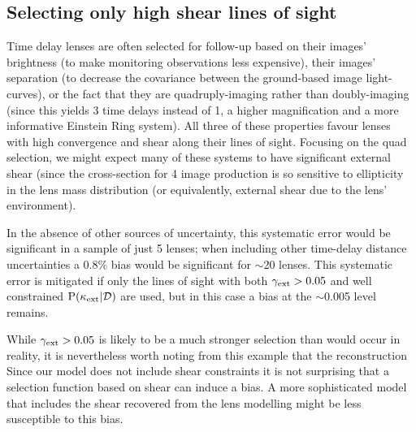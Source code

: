 \documentclass[useAMS,usenatbib,a4paper]{mn2e}
\begin{document}

\subsection{Selecting only high shear lines of sight}
\label{sec:bias:tightPDF}

Time delay lenses are often selected for follow-up based on their images'
brightness (to make monitoring observations less expensive), their images'
separation (to decrease the covariance between the ground-based image
light-curves), or the fact that they are quadruply-imaging rather than
doubly-imaging (since this yields 3 time delays instead of 1, a higher
magnification and a more informative Einstein Ring system). All three of these
properties favour lenses with high convergence and shear along their lines of
sight. Focusing on the quad selection, we might expect many of these systems
to have significant external shear (since the cross-section for 4 image
production is so sensitive to ellipticity in the lens mass distribution (or
equivalently, external shear due to the lens' environment). 

  In the absence of other sources of
uncertainty, this systematic error would be significant in a sample of just 5
lenses; when including other time-delay distance uncertainties a 0.8\% bias would be
significant for $\sim$20 lenses. This systematic error is mitigated if only the lines of sight with both
$\gamma_{\rm ext}>0.05$ and well constrained ${\rm P}(\kappa_{\rm ext}|{\mathcal{D}})$ are used, but in this
case a bias at the $\sim$0.005 level remains. 

While $\gamma_{\rm ext}>0.05$ is likely to be a much stronger selection than would
occur in reality, it is  nevertheless worth noting from this example that the
reconstruction \proceedure {} Since our model does not include shear
constraints it is not surprising that a selection function based on shear can
induce a bias. A more sophisticated model that includes the shear recovered
from the lens modelling might be less susceptible to this bias.
\end{document}
